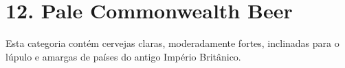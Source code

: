 \section*{12. Pale Commonwealth Beer}

Esta categoria contém cervejas claras, moderadamente fortes, inclinadas para o lúpulo e amargas de países do antigo Império Britânico.
